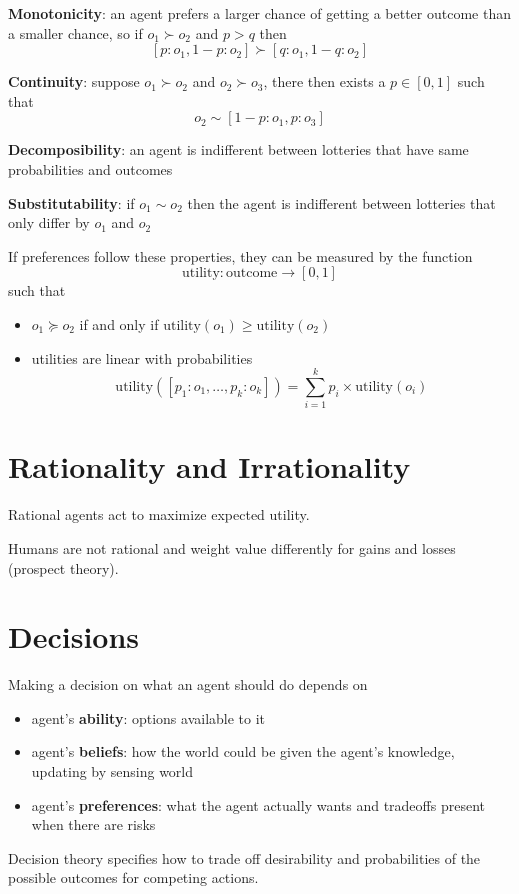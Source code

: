 \documentclass[11pt]{article}
\begin{document}
\textbf{Monotonicity}: an agent prefers a larger chance of getting a better outcome than a smaller
chance, so if \(o_{1} \succ o_{2}\) and \(p > q\) then
$$ [p : o_{1}, 1 - p : o_{2}] \succ [q : o_{1}, 1 - q : o_{2}] $$

\textbf{Continuity}: suppose \(o_{1} \succ o_{2}\) and \(o_{2} \succ o_{3}\), there then exists a
\(p \in [0,1]\) such that
$$ o_{2} \sim [1 - p : o_{1}, p : o_{3}] $$

\textbf{Decomposibility}: an agent is indifferent between lotteries that have same probabilities and
outcomes

\textbf{Substitutability}: if \(o_{1} \sim o_{2}\) then the agent is indifferent between lotteries that
only differ by \(o_{1}\) and \(o_{2}\)

If preferences follow these properties, they can be measured by the function
$$ \text{utility} : \text{outcome} \to [0,1] $$
such that
\begin{itemize}
\item \(o_{1} \succeq o_{2}\) if and only if \(\text{utility}(o_{1}) \ge \text{utility}(o_{2})\)
\item utilities are linear with probabilities
$$ \text{utility}([p_{1} : o_{1}, \dots, p_{k} : o_{k}]) = \sum_{i=1}^{k} p_{i} \times \text{utility}(o_{i}) $$
\end{itemize}
\section{Rationality and Irrationality}
\label{sec:org0ec58b5}
Rational agents act to maximize expected utility.

Humans are not rational and weight value differently for gains and losses (prospect theory).
\section{Decisions}
\label{sec:orgd59f5bd}
Making a decision on what an agent should do depends on
\begin{itemize}
\item agent's \textbf{ability}: options available to it
\item agent's \textbf{beliefs}: how the world could be given the agent's knowledge, updating by sensing
world
\item agent's \textbf{preferences}: what the agent actually wants and tradeoffs present when
there are risks
\end{itemize}

Decision theory specifies how to trade off desirability and probabilities of the possible
outcomes for competing actions.
\end{document}
